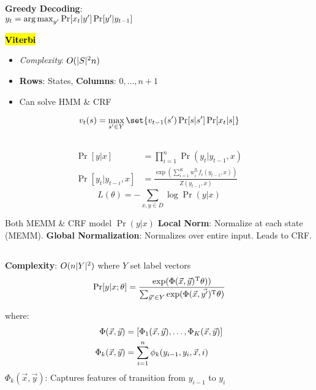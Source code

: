 \documentclass[8pt]{extarticle}
\renewcommand{\green}[1]{{\color{ForestGreen} #1}}
\newcommand{\greenbf}[1]{\textbf{\green{#1}}}
\newcommand{\redbf}[1]{\textbf{\red{#1}}}
\begin{document}
\begin{multicols}{3}
  \greenbf{Greedy Decoding}: \\${y_t = \operatorname*{arg\,max}_{y'} \Pr[x_t \vert y'] \Pr[y' \vert y_{t-1}]}$

  \greenbf{\hl{Viterbi}}
  \begin{itemize}
    \item \textit{Complexity}: $O(\lvert S\rvert^{2} n)$
    \item \textbf{Rows}: States, \textbf{Columns}: ${0,\ldots,n+1}$
    \item Can solve HMM \& CRF
  \end{itemize}

  \begin{equation*}
    v_{t}(s) = \max_{s' \in Y}\set{v_{t-1}(s') \Pr[s \vert s'] \Pr[x_t \vert s]}
  \end{equation*}

  \subsection*{}
  \begin{align*}
    \Pr[y\vert x] &= \prod_{i=1}^{n} \Pr(y_t \vert y_{t-1},x) \\
    \Pr[y_{t} \vert y_{t-i}, x] &= \frac{\exp\left(\sum_{i=1}^{K}w_{i}^{y_t}f_{i}(y_{t-1},x) \right)}{Z(y_{t-1},x)}
  \end{align*}
  \begin{equation*}
    L(\theta) = -\sum_{x,y\in D} \log \Pr(y \vert x)
  \end{equation*}

  Both MEMM \& CRF model $\Pr(y\vert x)$
  \greenbf{Local Norm}: Normalize at each state (MEMM). \redbf{Label bias} \greenbf{Global Normalization}: Normalizes over entire input. Leads to CRF\@.

  \subsection*{}
  \textbf{Complexity}: $O(n\lvert Y\rvert^{2})$ where $Y$ set label vectors
  \begin{equation*}
    \Pr[y \vert x; \theta] = \frac{\exp(\Phi(\vec{x},\vec{y})^{\text{T}}\theta))}{\sum_{\vec{y}' \in Y} \exp(\Phi(\vec{x}, \vec{y'})^{\text{T}}\theta)}
  \end{equation*}

  where:
  \begin{align*}
      \Phi(\vec{x},\vec{y}) &= \lbrack\Phi_{1}(\vec{x},\vec{y}),\ldots,\Phi_{K}(\vec{x},\vec{y})\rbrack \\
      \Phi_{k}(\vec{x},\vec{y}) &= \sum_{i=1}^{n} \phi_{k}(y_{i-1},y_{i},\vec{x},i)
  \end{align*}
  $\Phi_{k}(\vec{x},\vec{y})$: Captures features of transition from $y_{i-1}$ to $y_i$


\end{multicols}
\end{document}
